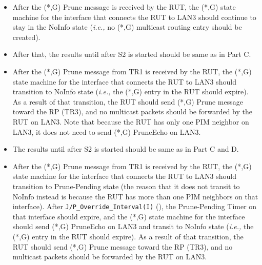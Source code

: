 \documentclass[11pt]{report}
\newcommand{\ie}{\emph{i.e.,}\xspace}
\begin{document}

\begin{itemize}

  \item After the (*,G) Prune message is received by the RUT,
  the (*,G) state machine for the interface that connects the RUT to
  LAN3 should continue to stay in the NoInfo state (\ie no (*,G) multicast
  routing entry should be created).

  \item After that, the results until after S2 is started should be same as in
  Part C.

  \item After the (*,G) Prune message from TR1 is received by the RUT,
  the (*,G) state machine for the interface that connects the RUT to
  LAN3 should transition to NoInfo state
  (\ie the (*,G) entry in the RUT should expire).
  As a result of that transition, the RUT should send (*,G) Prune
  message toward the RP (TR3), and no multicast packets should be
  forwarded by the RUT on LAN3. Note that because the RUT has only one
  PIM neighbor on LAN3, it does not need to send (*,G) PruneEcho on
  LAN3.

\end{itemize}


\begin{itemize}

  \item The results until after S2 is started should be same as in
  Part C and D.

  \item After the (*,G) Prune message from TR1 is received by the RUT,
  the (*,G) state machine for the interface that connects the RUT to
  LAN3 should transition to Prune-Pending state (the reason that it does
  not transit to NoInfo instead is because the RUT has more than one PIM
  neighbors on that interface).
  After \verb=J/P_Override_Interval(I)= (\PimsmJPOverrideIntervalI),
  the Prune-Pending Timer on that interface should expire, and the
  (*,G) state machine for the interface should send (*,G) PruneEcho
  on LAN3 and transit to NoInfo
  state (\ie the (*,G) entry in the RUT should expire).
  As a result of that transition, the RUT should send (*,G) Prune
  message toward the RP (TR3), and no multicast packets should be
  forwarded by the RUT on LAN3.

\end{itemize}
\end{document}

